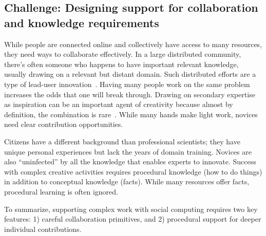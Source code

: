 \subsection{Challenge: Designing support for collaboration and knowledge requirements}
While people are connected online and collectively have access to many resources, they need ways to collaborate effectively. 
In a large distributed community, there’s often someone who happens to 
have important relevant knowledge, usually drawing on a relevant but 
distant domain. Such distributed efforts are a type of lead-user innovation~\cite{VonHippel2005a}. 
Having many people work on the same problem increases the odds that 
one will break through. Drawing on secondary expertise as inspiration can
 be an important agent of creativity because almost by definition, the 
combination is rare~\cite{Boden2004}. While many hands make light work, novices need clear contribution opportunities. 

Citizens have a different background than professional scientists; they have unique
 personal experiences but lack the years of domain training. Novices are also
“uninfected” by all the knowledge that enables experts to
innovate. Success with complex creative activities requires procedural
knowledge (how to do things) in addition to conceptual
knowledge (facts). While many resources offer facts, procedural
learning is often ignored. 




To summarize, supporting complex work with social computing requires two key features: 
1) careful collaboration primitives, and 2) procedural support for deeper individual contributions.


